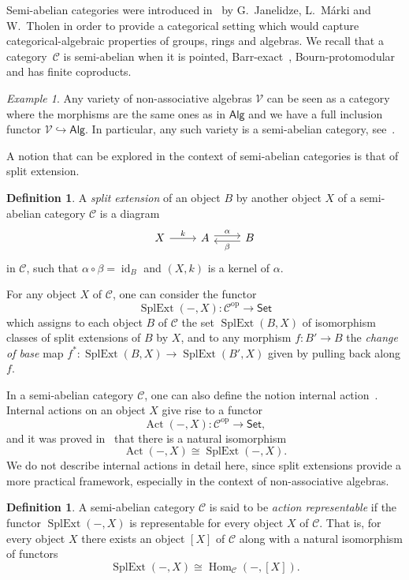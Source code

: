\documentclass[reqno,a4paper]{amsart}
\theoremstyle{plain}
\theoremstyle{definition}
\newtheorem{definition}[subsection]{Definition}
\theoremstyle{remark}
\newtheorem{example}[subsection]{Example}
\numberwithin{equation}{section}
\newcommand{\C}{\ensuremath{\mathcal{C}}}
\newcommand{\V}{\mathcal{V}}
\DeclareMathOperator{\op}{op}
\DeclareMathOperator{\Act}{Act}
\DeclareMathOperator{\Hom}{Hom}
\DeclareMathOperator{\SplExt}{SplExt}
\DeclareMathOperator{\id}{id}
\newcommand{\Set}{\ensuremath{\mathsf{Set}}}
\newcommand{\Alg}{\ensuremath{\mathsf{Alg}}}
\begin{document}
Semi-abelian categories were introduced in~\cite{Semi-Ab} by G.~Janelidze, L.~Márki and W.~Tholen in order to provide a categorical setting which would capture categorical-algebraic properties of groups, rings and algebras. We recall that a category~$\C$ is semi-abelian when it is pointed, Barr-exact~\cite{Barr}, Bourn-protomodular~\cite{Bourn} and has finite coproducts.

\begin{example}
Any variety of non-associative algebras $\V$ can be seen as a category where the morphisms are the same ones as in $\Alg$ and we have a full inclusion functor $\V \hookrightarrow \Alg$. In particular, any such variety is a semi-abelian category, see~\cite[Theorem 9.5]{VdL-NAA}.
\end{example}

A notion that can be explored in the context of semi-abelian categories is that of split extension.

\begin{definition}
A \emph{split extension} of an object $B$ by another object $X$ of a semi-abelian category $\C$ is a diagram
\begin{equation*}\label{eq:split_ext}
\begin{tikzcd}
X\arrow [r, "k"]
&A \arrow[r, shift left, "\alpha"] &
B\ar[l, shift left, "\beta"]
\end{tikzcd}
\end{equation*}
in $\C$, such that $\alpha \circ \beta = \id_B$ and $(X,k)$ is a kernel of $\alpha$.
\end{definition}

For any object $X$ of $\C$, one can consider the functor
\[
\SplExt(-,X) \colon \C^{\op} \to \Set
\]
which assigns to each object $B$ of $\C$ the set $\SplExt(B,X)$ of isomorphism classes of split extensions of $B$ by $X$, and to any morphism $f \colon B'\to  B$ the \emph{change of base} map $f^* \colon \SplExt(B,X) \to \SplExt(B',X)$ given by pulling back along $f$.

In a semi-abelian category $\C$, one can also define the notion internal action~\cite{BJK}. 
Internal actions on an object $X$ give rise to a functor
\[
\Act(-,X)\colon \C^{\op} \to \Set,
\]
and it was proved in~\cite{BJK} that there is a natural isomorphism
\[
\Act(-,X)\cong \SplExt(-,X).
\]
We do not describe internal actions in detail here, since split extensions provide a more practical framework, especially in the context of non-associative algebras.

\begin{definition}\cite{BJK}
A semi-abelian category $\C$ is said to be \emph{action representable} if the functor $\SplExt(-,X)$ is representable for every object $X$ of $\C$. That is, for every object $X$ there exists an object $[X]$ of $\C$ along with a natural isomorphism of functors
\[
\SplExt(-,X) \cong \Hom_{\C}(-,[X]).
\]
\end{definition}
\end{document}
